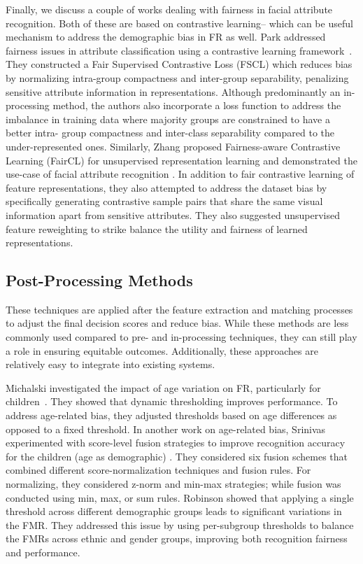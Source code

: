 Finally, we discuss a couple of works dealing with fairness in facial attribute
recognition. Both of these are based on contrastive learning-- which can be
useful mechanism to address the demographic bias in FR as well. Park \etal
addressed fairness issues in attribute classification using a contrastive
learning framework~\cite{park2022fair}. They constructed a Fair Supervised
Contrastive Loss (FSCL) which reduces bias by normalizing intra-group
compactness and inter-group separability, penalizing sensitive attribute
information in representations. Although predominantly an in-processing method,
the authors also incorporate a loss function to address the imbalance in
training data where majority groups are constrained to have a better intra-
group compactness and inter-class separability compared to the
under-represented ones.
%
Similarly, Zhang \etal proposed Fairness-aware Contrastive Learning
(FairCL) for unsupervised representation learning and demonstrated the use-case
of facial attribute recognition \cite{zhang2022fairness}. In addition to fair
contrastive learning of feature representations, they also attempted to address
the dataset bias by specifically generating contrastive sample pairs that share
the same visual information apart from sensitive attributes. They also
suggested unsupervised feature reweighting to strike balance the utility and
fairness of learned representations.

\subsection{Post-Processing Methods}

These techniques are applied after the feature extraction and matching
processes to adjust the final decision scores and reduce bias. While these
methods are less commonly used compared to pre- and in-processing techniques,
they can still play a role in ensuring equitable outcomes. Additionally, these
approaches are relatively easy to integrate into existing systems.

Michalski \etal investigated the impact of age variation on FR, particularly
for children~\cite{michalski2018impact}. They showed that dynamic thresholding
improves performance. To address age-related bias, they adjusted thresholds
based on age differences as opposed to a fixed threshold. In another work on
age-related bias, Srinivas \etal experimented with score-level fusion
strategies to improve recognition accuracy for the children (age as
demographic) \cite{srinivas2019face}. They considered six fusion schemes that
combined different score-normalization techniques and fusion rules. For
normalizing, they considered z-norm and min-max strategies; while fusion was
conducted using min, max, or sum rules.
%
Robinson \etal \cite{robinson2020face} showed that applying a single threshold
across different demographic groups leads to significant variations in the FMR.
They addressed this issue by using per-subgroup thresholds to balance the FMRs
across ethnic and gender groups, improving both recognition fairness and
performance. 

